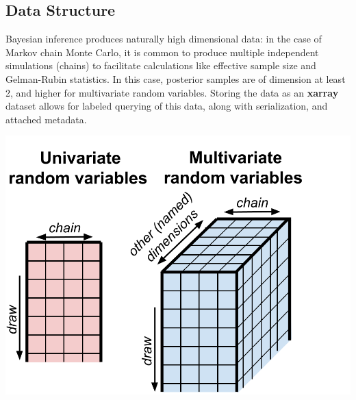 \documentclass[a0,portrait]{a0poster}
\begin{document}
\begin{multicols}{3} %


\color{Black} %

\section{Data Structure}

Bayesian inference produces naturally high dimensional data: in the case of Markov chain Monte Carlo, it is common to produce multiple independent simulations (chains) to facilitate calculations like effective sample size and Gelman-Rubin statistics. In this case, posterior samples are of dimension at least 2, and higher for multivariate random variables. Storing the data as an \textbf{xarray} dataset allows for labeled querying of this data, along with serialization, and attached metadata.

\begin{center}\vspace{1cm}
\includegraphics[width=1.0\linewidth]{figures/xarray}
\end{center}\vspace{1cm}


\end{multicols}
\end{document}
